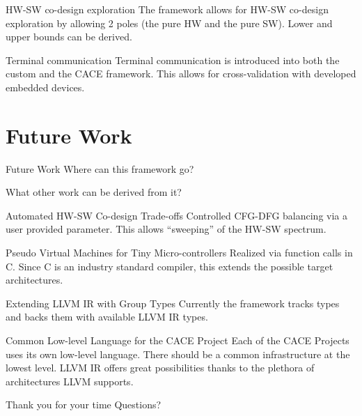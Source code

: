 \documentclass{beamer}
\begin{document}
\begin{frame}{HW-SW co-design exploration}
  The framework allows for HW-SW co-design exploration by allowing
  2 poles (the pure HW and the pure SW). Lower and upper bounds
  can be derived.
\end{frame}

\begin{frame}{Terminal communication}
  Terminal communication is introduced into both the custom and the
  CACE framework. This allows for cross-validation with developed
  embedded devices.
\end{frame}

\section{Future Work}

\begin{frame}{Future Work}
  Where can this framework go?

  What other work can be derived from it?
\end{frame}

\begin{frame}{Automated HW-SW Co-design Trade-offs}
  Controlled CFG-DFG balancing via a user provided parameter. This
  allows ``sweeping'' of the HW-SW spectrum.
\end{frame}

\begin{frame}{Pseudo Virtual Machines for Tiny Micro-controllers}
  Realized via function calls in C. Since C is an industry standard
  compiler, this extends the possible target architectures.
\end{frame}

\begin{frame}{Extending LLVM IR with Group Types}
  Currently the framework tracks types and backs them with
  available LLVM IR types.
\end{frame}

\begin{frame}{Common Low-level Language for the CACE Project}
  Each of the CACE Projects uses its own low-level language. There
  should be a common infrastructure at the lowest level. LLVM IR
  offers great possibilities thanks to the plethora of architectures
  LLVM supports.
\end{frame}

\begin{frame}{Thank you for your time}
  Questions?
\end{frame}
\end{document}
